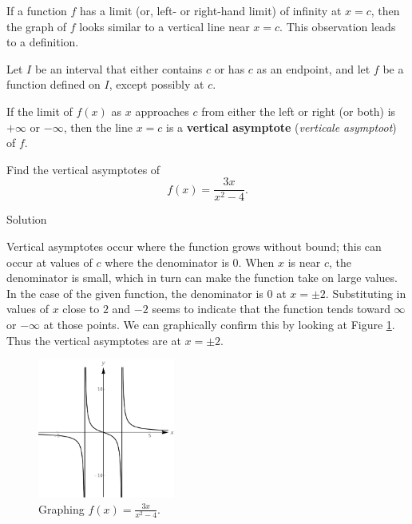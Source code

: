 If a function $f$ has a limit (or, left- or right-hand limit) of infinity at $x=c$, then the graph of $f$ looks similar to a vertical line near $x=c$.  This observation leads to a definition.

\begin{definition}\label{def:vertical_asymptote}
Let $I$ be an interval that either contains $c$ or has $c$ as an endpoint, and let $f$ be a function defined on $I$, except possibly at $c$.

If the limit of $f(x)$ as $x$ approaches $c$ from either the left or right (or both) is $+\infty$ or $-\infty$, then the line $x=c$ is a \textbf{vertical asymptote} (\textit{verticale asymptoot}) of $f$. 
\end{definition}

\begin{example}\label{ex_vertasy1}
Find the vertical asymptotes of 
$$f(x)=\dfrac{3x}{x^2-4}.$$

Solution 


Vertical asymptotes occur where the function grows without bound; this can occur at values of $c$ where the denominator is 0. When $x$ is near $c$, the denominator is small, which in turn can make the function take on large values.  In the case of the given function, the denominator is 0 at $x=\pm 2$.  Substituting in values of $x$ close to $2$ and $-2$ seems to indicate that the function tends toward $\infty$ or $-\infty$ at those points.  We can graphically confirm this by looking at Figure \ref{fig_lim_20}. Thus the vertical asymptotes are at $x=\pm2$.

\begin{figure}[H]
	\begin{center}
			\includegraphics[width=0.4\textwidth]{fig_lim_20}
	\caption{Graphing $f(x) = \frac{3x}{x^2-4}$. }
	\label{fig_lim_20}
	\end{center}
\end{figure}


\end{example}

